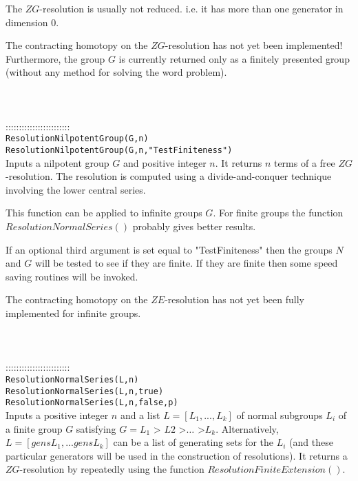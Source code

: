 \documentclass[a4paper,11pt]{report}
\begin{document}
{ The $ZG$-resolution is usually not reduced. i.e. it has more than one generator in
dimension 0.

 The contracting homotopy on the $ZG$-resolution has not yet been implemented! Furthermore, the group $G$ is currently returned only as a finitely presented group (without any method
for solving the word problem). \\
 \\
 \\
 \\
 ::::::::::::::::::::::::\\
 \texttt{ResolutionNilpotentGroup(G,n) }\\
 \texttt{ResolutionNilpotentGroup(G,n,"TestFiniteness")}\\
 

 Inputs a nilpotent group $G$ and positive integer $n$. It returns $n$ terms of a free $ZG$-resolution. The resolution is computed using a divide-and-conquer technique
involving the lower central series.

 This function can be applied to infinite groups $G$. For finite groups the function $ResolutionNormalSeries()$ probably gives better results.

 If an optional third argument is set equal to "TestFiniteness" then the groups $N$ and $G$ will be tested to see if they are finite. If they are finite then some speed
saving routines will be invoked.

 The contracting homotopy on the $ZE$-resolution has not yet been fully implemented for infinite groups. \\
 \\
 \\
 \\
 ::::::::::::::::::::::::\\
 \texttt{ResolutionNormalSeries(L,n) }\\
 \texttt{ResolutionNormalSeries(L,n,true)}\\
 \texttt{ResolutionNormalSeries(L,n,false,p)}\\
 

 Inputs a positive integer $n$ and a list $L = [L_1 , ..., L_k]$ of normal subgroups $L_i$ of a finite group $G$ satisfying $G = L_1$ {\textgreater} $L2$ {\textgreater}$ \ldots $ {\textgreater}$ L_k$. Alternatively, $L = [gensL_1, ... gensL_k]$ can be a list of generating sets for the $L_i$ (and these particular generators will be used in the construction of
resolutions). It returns a $ZG$-resolution by repeatedly using the function $ResolutionFiniteExtension()$.

}
\end{document}
